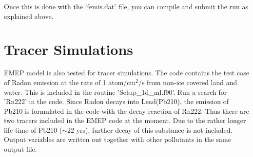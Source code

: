 Once this is done with the 'femis.dat' file, you can compile and
submit the run as explained above.   

\section{Tracer Simulations}

EMEP model is also tested for tracer simulations.  The code contains
the test case of Radon emission at the rate of 1 atom/cm$^{2}$/s from non-ice
covered land and water.  This is included in the routine
'Setup\_1d\_ml.f90'.  Run a search for 'Rn222' in the code.  Since Radon
decays into Lead(Pb210), the emission of Pb210 is formulated in the
code with the decay reaction of Rn222.  Thus there are two tracers
included in the EMEP code at the moment.  Due to the rather longer
life time of Pb210 (${\sim}$22 yrs), further decay of this substance is not
included.   Output variables are written out together with other
pollutants in the same output file.  




